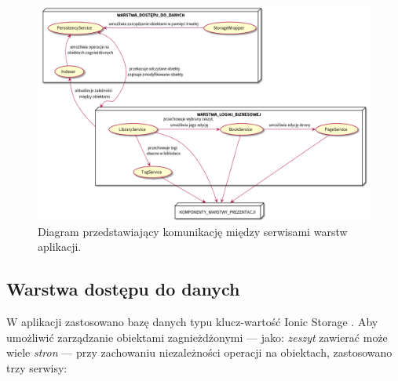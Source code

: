 \begin{figure}[H]
	\begin{center}
		\includegraphics[scale=0.4]{media/LayerComunication.png}
	\end{center}
	\caption{Diagram przedstawiający komunikację między serwisami warstw aplikacji.}
	\label{rys:layer-communication}
\end{figure}

\subsection{Warstwa dostępu do danych}
W aplikacji zastosowano bazę danych typu klucz-wartość Ionic Storage \cite{storage}. Aby umożliwić
zarządzanie obiektami zagnieżdżonymi — jako: \textit{zeszyt} zawierać może wiele \textit{stron} — przy zachowaniu
niezależności operacji na obiektach, zastosowano trzy serwisy:

